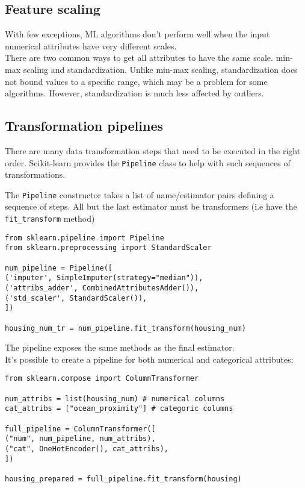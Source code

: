 \documentclass[french]{article}
\begin{document}
\subsection{Feature scaling}

With few exceptions, ML algorithms don't perform well when the input numerical attributes have very different scales.\\

There are two common ways to get all attributes to have the same scale.  min-max scaling and standardization. Unlike min-max scaling, standardization does not bound values to a specific range, which may be a problem for some algorithms. However, standardization is much less affected by outliers.

\subsection{Transformation pipelines}

There are many data transformation steps that need to be executed in the right order. Scikit-learn provides the \lstinline{Pipeline} class to help with such sequences of transformations.

The \lstinline{Pipeline} constructor takes a list of name/estimator pairs defining a sequence of steps. All but the last estimator must be transformers (i.e have the \lstinline{fit_transform} method)

\begin{lstlisting}
from sklearn.pipeline import Pipeline
from sklearn.preprocessing import StandardScaler

num_pipeline = Pipeline([
('imputer', SimpleImputer(strategy="median")),
('attribs_adder', CombinedAttributesAdder()),
('std_scaler', StandardScaler()),
])

housing_num_tr = num_pipeline.fit_transform(housing_num)
\end{lstlisting}

The pipeline exposes the same methods as the final estimator.\\

It's possible to create a pipeline for both numerical and categorical attributes:

\begin{lstlisting}
from sklearn.compose import ColumnTransformer

num_attribs = list(housing_num) # numerical columns
cat_attribs = ["ocean_proximity"] # categoric columns

full_pipeline = ColumnTransformer([
("num", num_pipeline, num_attribs),
("cat", OneHotEncoder(), cat_attribs),
])

housing_prepared = full_pipeline.fit_transform(housing)
\end{lstlisting}
\end{document}

